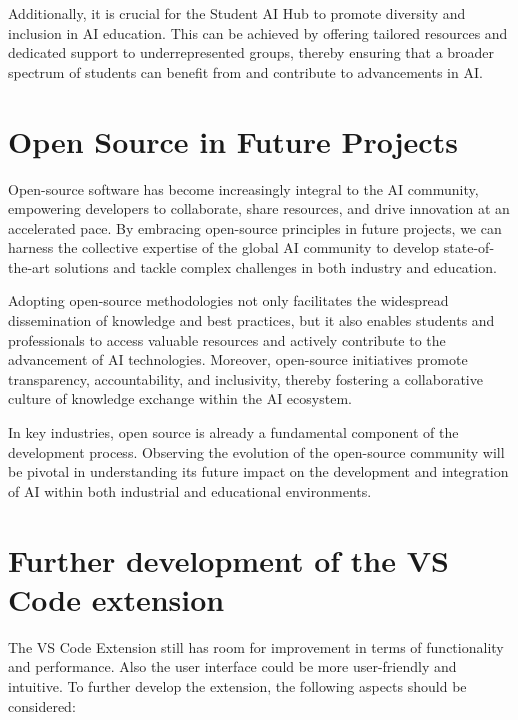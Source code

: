 Additionally, it is crucial for the Student AI Hub to promote diversity and inclusion in AI education. This can be achieved by offering tailored resources and dedicated support to underrepresented groups, thereby ensuring that a broader spectrum of students can benefit from and contribute to advancements in AI.

\section{Open Source in Future Projects}

Open-source software has become increasingly integral to the AI community, empowering developers to collaborate, share resources, and drive innovation at an accelerated pace. By embracing open-source principles in future projects, we can harness the collective expertise of the global AI community to develop state-of-the-art solutions and tackle complex challenges in both industry and education.

Adopting open-source methodologies not only facilitates the widespread dissemination of knowledge and best practices, but it also enables students and professionals to access valuable resources and actively contribute to the advancement of AI technologies. Moreover, open-source initiatives promote transparency, accountability, and inclusivity, thereby fostering a collaborative culture of knowledge exchange within the AI ecosystem.

In key industries, open source is already a fundamental component of the development process. Observing the evolution of the open-source community will be pivotal in understanding its future impact on the development and integration of AI within both industrial and educational environments.

\section{Further development of the VS Code extension}

The VS Code Extension still has room for improvement in terms of functionality and performance. Also the user interface could be more user-friendly and intuitive. To further develop the extension, the following aspects should be considered:

